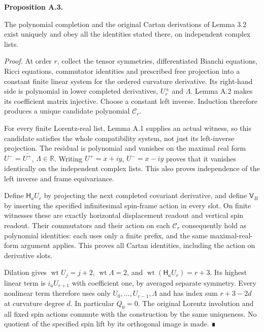 \documentclass[
  english,
  11pt,
  reqno]{amsart}
\makeatletter
\newcommand{\pandocstatementheading}[1]{%
  \par\addpenalty{\@beginparpenalty}%
  \addvspace{.5\baselineskip plus .2\baselineskip minus .2\baselineskip}%
  {\normalfont\bfseries #1\par}%
  \nobreak\@afterindenttrue\@afterheading
}
\makeatother
\begin{document}
\pandocstatementheading{\protect{}\label{prop:gg-polynomial-completion}Proposition A.3.}

The polynomial completion and the original Cartan derivations of Lemma
3.2 exist uniquely and obey all the identities stated there, on
independent complex lists.

\emph{Proof.} At order \(r\), collect the tensor symmetries,
differentiated Bianchi equations, Ricci equations, commutator identities
and prescribed free projection into a constant finite linear system for
the ordered curvature derivative. Its right-hand side is polynomial in
lower completed derivatives, \(U_r^\pm\) and \(\Lambda\). Lemma A.2
makes its coefficient matrix injective. Choose a constant left inverse.
Induction therefore produces a unique candidate polynomial
\(\mathcal C_r\).

For every finite Lorentz-real list, Lemma A.1 supplies an actual
witness, so this candidate satisfies the whole compatibility system, not
just its left-inverse projection. The residual is polynomial and
vanishes on the maximal real form \(U^-=\overline{U^+}\),
\(\Lambda\in\mathbb R\). Writing \(U^+=x+iy\), \(U^-=x-iy\) proves that
it vanishes identically on the independent complex lists. This also
proves independence of the left inverse and frame equivariance.

Define \(\mathsf H_aU_r\) by projecting the next completed covariant
derivative, and define \(\mathsf V_B\) by inserting the specified
infinitesimal spin-frame action in every slot. On finite witnesses these
are exactly horizontal displacement readout and vertical spin readout.
Their commutators and their action on each \(\mathcal C_r\) consequently
hold as polynomial identities: each uses only a finite prefix, and the
same maximal-real-form argument applies. This proves all Cartan
identities, including the action on derivative slots.

Dilation gives \(\operatorname{wt}U_j=j+2\),
\(\operatorname{wt}\Lambda=2\), and
\(\operatorname{wt}(\mathsf H_aU_r)=r+3\). Its highest linear term is
\(i_aU_{r+1}\) with coefficient one, by averaged separate symmetry.
Every nonlinear term therefore uses only \(U_0,\ldots,U_{r-1},\Lambda\)
and has index sum \(r+3-2d\) at curvature degree \(d\). In particular
\(Q_0=0\). The original Lorentz involution and all fixed spin actions
commute with the construction by the same uniqueness. No quotient of the
specified spin lift by its orthogonal image is made. ∎

\protect{}\label{sec:gg-formal-normal-uniqueness}
\end{document}
